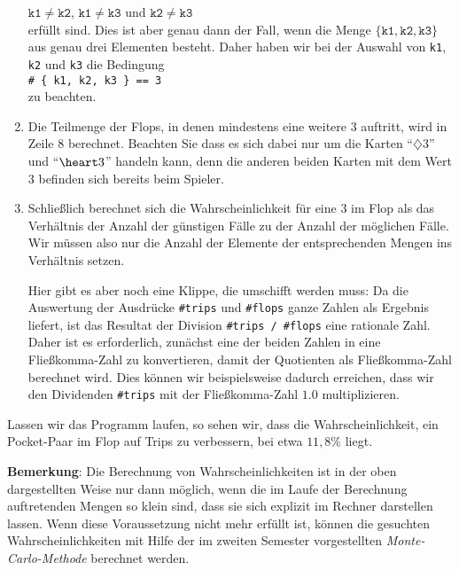 \begin{enumerate}
      \hspace*{1.3cm}
      $\mathtt{k1} \not= \mathtt{k2}$, \quad 
      $\mathtt{k1} \not= \mathtt{k3}$  \quad und \quad
      $\mathtt{k2} \not= \mathtt{k3}$
      \\[0.2cm]
      erfüllt sind.  Dies ist aber genau dann der Fall, wenn die Menge
      $\{ \mathtt{k1}, \mathtt{k2}, \mathtt{k3} \}$ aus genau drei Elementen besteht.
      Daher haben wir bei der Auswahl von \texttt{k1}, \texttt{k2} und \texttt{k3} die Bedingung
      \\[0.2cm]
      \hspace*{1.3cm}
      \texttt{\# \{ k1, k2, k3 \} == 3 }
      \\[0.2cm]
      zu beachten.
\item Die Teilmenge der Flops, in denen mindestens eine weitere 3 auftritt, wird in Zeile 8
      berechnet.  Beachten Sie dass es sich dabei nur um die Karten ``$\diamondsuit 3$'' und
      ``$\heart 3$'' handeln kann, denn die anderen beiden Karten mit dem Wert $3$ befinden sich bereits
      beim Spieler.
\item Schließlich berechnet sich die Wahrscheinlichkeit für eine 3 im Flop als das Verhältnis der 
      Anzahl der günstigen Fälle zu der Anzahl der möglichen Fälle.  Wir müssen also nur die Anzahl
      der Elemente der entsprechenden Mengen ins Verhältnis setzen.  

      Hier gibt es aber noch eine Klippe, die umschifft werden muss: Da die Auswertung der Ausdrücke
      \texttt{\#trips} und \texttt{\#flops} ganze Zahlen als Ergebnis liefert, ist das Resultat der Division
      \texttt{\#trips / \#flops} eine rationale Zahl.
      Daher ist es erforderlich, zunächst eine der beiden Zahlen in eine Fließkomma-Zahl zu konvertieren,
      damit der Quotienten als Fließkomma-Zahl berechnet wird.  Dies können wir beispielsweise dadurch
      erreichen, dass wir den Dividenden \texttt{\#trips} mit der Fließkomma-Zahl $1.0$
      multiplizieren.
\end{enumerate}
Lassen wir das Programm laufen, so sehen wir, dass die Wahrscheinlichkeit, ein
Pocket-Paar im Flop auf Trips zu verbessern, bei etwa $11,8\%$ liegt.
\vspace*{0.1cm}

\noindent
\textbf{Bemerkung}:  Die Berechnung von Wahrscheinlichkeiten ist in der oben dargestellten
Weise nur dann möglich, wenn die im Laufe der Berechnung auftretenden Mengen so klein
sind, dass sie sich explizit im Rechner darstellen lassen.  Wenn diese Voraussetzung nicht
mehr erfüllt ist, können die gesuchten Wahrscheinlichkeiten mit Hilfe der im zweiten Semester
vorgestellten \emph{Monte-Carlo-Methode} berechnet werden.


